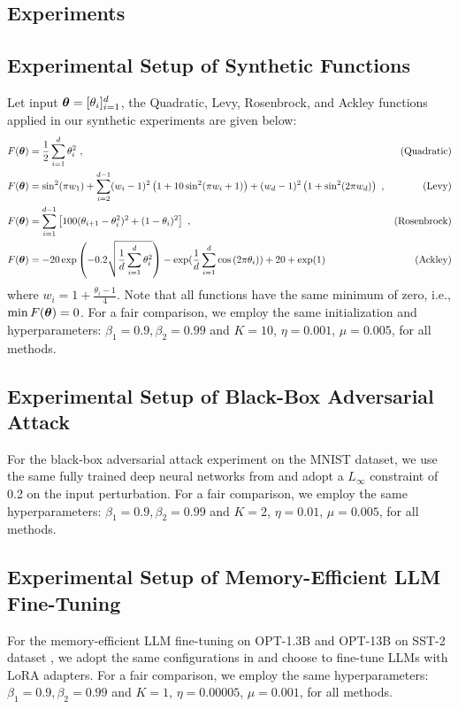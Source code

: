 \begin{appendices}
\section{Experiments}
\subsection{Experimental Setup of Synthetic Functions}\label{appx:syn}
Let input ${\bm{\theta}}=[\theta_i]_{i=1}^d$, the Quadratic, Levy, Rosenbrock, and Ackley functions applied in our synthetic experiments are given below:
\begin{equation}
\begin{aligned}
    F({\bm{\theta}})&= \frac{1}{2}\sum_{i=1}^d \theta_i^2 \ , &(\text{Quadratic}) \\
    F({\bm{\theta}}) &= \sin^2(\pi w_1) + \sum_{i=2}^{d-1} (w_i - 1)^2 \left(1 + 10 \sin^2(\pi w_i + 1)\right) + (w_d - 1)^2 \left(1 + \sin^2(2 \pi w_d)\right) \ , &(\text{Levy}) \\
    F({\bm{\theta}})&=\sum_{i=1}^{d-1} \left[100(\theta_{i+1} - \theta_i^2)^2 + (1 - \theta_i)^2\right] \ , &(\text{Rosenbrock}) \\
    F({\bm{\theta}})&=-20\exp\left(-0.2\sqrt{\frac{1}{d} \sum_{i=1}^{d} \theta_{i}^{2}}\right)-\exp (\frac{1}{d} \sum_{i=1}^{d} \cos \left(2\pi \theta_{i}\right))+20+\exp (1) &(\text{Ackley})
\end{aligned}
\end{equation}
where $w_i = 1 + \frac{\theta_i - 1}{4}$.
Note that all functions have the same minimum of zero, i.e., $\min F({\bm{\theta}})=0$. For a fair comparison, we employ the same initialization and hyperparameters: $\beta_1=0.9, \beta_2=0.99$ and $K=10$, $\eta=0.001$, $\mu=0.005$, for all methods.


\subsection{Experimental Setup of Black-Box Adversarial Attack}\label{appx:attack}
For the black-box adversarial attack experiment on the MNIST dataset, we use the same fully trained deep neural networks from \citep{zord} and adopt a $L_{\infty}$ constraint of 0.2 on the input perturbation. For a fair comparison, we employ the same hyperparameters: $\beta_1=0.9, \beta_2=0.99$ and $K=2$, $\eta=0.01$, $\mu=0.005$, for all methods.

\subsection{Experimental Setup of Memory-Efficient LLM Fine-Tuning}\label{appx:tuning}
For the memory-efficient LLM fine-tuning on OPT-1.3B and OPT-13B on SST-2 dataset \citep{sst2}, we adopt the same configurations in \citep{mezo} and choose to fine-tune LLMs with LoRA adapters. For a fair comparison, we employ the same hyperparameters: $\beta_1=0.9, \beta_2=0.99$ and $K=1$, $\eta=0.00005$, $\mu=0.001$, for all methods.

\end{appendices}